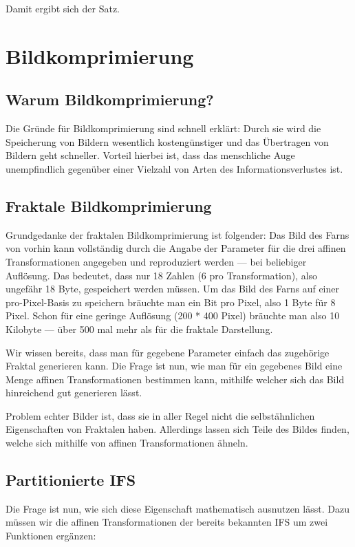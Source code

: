 \documentclass[afourpaper]{tufte-handout}
\begin{document}
Damit ergibt sich der Satz.

\section{Bildkomprimierung}

\subsection{Warum Bildkomprimierung?}

Die Gründe für Bildkomprimierung sind schnell erklärt: Durch sie wird die Speicherung von Bildern wesentlich kostengünstiger und das Übertragen von Bildern geht schneller. Vorteil hierbei ist, dass das menschliche Auge unempfindlich gegenüber einer Vielzahl von Arten des Informationsverlustes ist.

\subsection{Fraktale Bildkomprimierung}

Grundgedanke der fraktalen Bildkomprimierung ist folgender: Das Bild des Farns von vorhin kann vollständig durch die Angabe der Parameter für die drei affinen Transformationen angegeben und reproduziert werden --- bei beliebiger Auflösung. Das bedeutet, dass nur 18 Zahlen (6 pro Transformation), also ungefähr 18 Byte, gespeichert werden müssen. Um das Bild des Farns auf einer pro-Pixel-Basis zu speichern bräuchte man ein Bit pro Pixel, also 1 Byte für 8 Pixel. Schon für eine geringe Auflösung (200 * 400 Pixel) bräuchte man also 10 Kilobyte --- über 500 mal mehr als für die fraktale Darstellung.

Wir wissen bereits, dass man für gegebene Parameter einfach das zugehörige Fraktal generieren kann. Die Frage ist nun, wie man für ein gegebenes Bild eine Menge affinen Transformationen bestimmen kann, mithilfe welcher sich das Bild hinreichend gut generieren lässt.

Problem echter Bilder ist, dass sie in aller Regel nicht die selbstähnlichen Eigenschaften von Fraktalen haben. Allerdings lassen sich Teile des Bildes finden, welche sich mithilfe von affinen Transformationen ähneln.

\subsection{Partitionierte IFS}

Die Frage ist nun, wie sich diese Eigenschaft mathematisch ausnutzen lässt. Dazu müssen wir die affinen Transformationen der bereits bekannten IFS um zwei Funktionen ergänzen:
\end{document}
